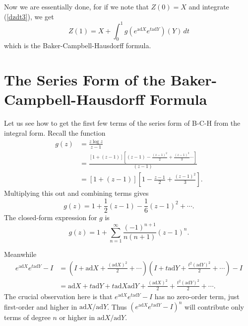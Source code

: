 \documentclass[12pt]{amsbook}
\theoremstyle{plain}
\numberwithin{equation}{chapter}
\numberwithin{theorem}{chapter}
\begin{document}
Now we are essentially done, for if we note that $Z(0)=X$ and integrate
(\ref{dzdt3}), we get
\[
Z(1)=X+\int_{0}^{1}g(e^{\mathrm{ad}X}e^{t\mathrm{ad}Y})(Y)\,dt
\]
which is the Baker-Campbell-Hausdorff formula.

\section{The Series Form of the Baker-Campbell-Hausdorff
Formula\label{series.section}}

Let us see how to get the first few terms of the series form of B-C-H from the
integral form. Recall the function
\begin{align*}
g\left(  z\right)   & =\frac{z\log z}{z-1}\\
& =\frac{\left[  1+\left(  z-1\right)  \right]  \left[  \left(  z-1\right)
-\frac{\left(  z-1\right)  ^{2}}2+\frac{\left(  z-1\right)  ^{3}}%
3\cdots\right]  }{\left(  z-1\right)  }\\
& =\left[  1+\left(  z-1\right)  \right]  \left[  1-\frac{z-1}2+\frac{\left(
z-1\right)  ^{2}}3\right]  \text{.}%
\end{align*}
Multiplying this out and combining terms gives
\[
g\left(  z\right)  =1+\frac12\left(  z-1\right)  -\frac16\left(  z-1\right)
^{2}+\cdots\text{.}%
\]
The closed-form expression for $g$ is
\[
g\left(  z\right)  =1+\sum_{n=1}^{\infty}\frac{\left(  -1\right)  ^{n+1}%
}{n\left(  n+1\right)  }\left(  z-1\right)  ^{n}\text{.}%
\]

Meanwhile
\begin{align*}
e^{\mathrm{ad}X}e^{t\mathrm{ad}Y}-I  & =\left(  I+\mathrm{ad}X+\frac{\left(
\mathrm{ad}X\right)  ^{2}}2+\cdots\right)  \left(  I+t\mathrm{ad}Y+\frac
{t^{2}\left(  \mathrm{ad}Y\right)  ^{2}}2+\cdots\right)  -I\\
& =\mathrm{ad}X+t\mathrm{ad}Y+t\mathrm{ad}X\mathrm{ad}Y+\frac{\left(
\mathrm{ad}X\right)  ^{2}}2+\frac{t^{2}\left(  \mathrm{ad}Y\right)  ^{2}%
}2+\cdots\text{.}%
\end{align*}
The crucial observation here is that $e^{\mathrm{ad}X}e^{t\mathrm{ad}Y}-I$ has
no zero-order term, just first-order and higher in $\mathrm{ad}X/\mathrm{ad}%
Y$. Thus $\left(  e^{\mathrm{ad}X}e^{t\mathrm{ad}Y}-I\right)  ^{n}$ will
contribute only terms of degree $n$ or higher in $\mathrm{ad}X/\mathrm{ad}Y$.
\end{document}
